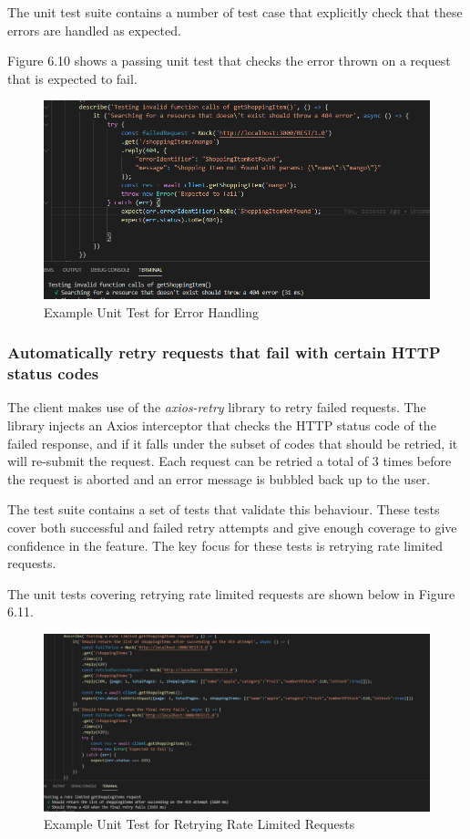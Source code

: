 The unit test suite contains a number of test case that explicitly check that these errors are handled as expected.

Figure 6.10 shows a passing unit test that checks the error thrown on a request that is expected to fail.
\begin{figure}[!htb]
    \caption{Example Unit Test for Error Handling}
\centering
\includegraphics[scale=0.57]{FYP_Dissertation_template/Figures/handcrafted-client-error-handling.PNG}
\end{figure}
\FloatBarrier
\subsubsection{Automatically retry requests that fail with certain HTTP status codes}
The client makes use of the \textit{axios-retry} library to retry failed requests. The library injects an Axios interceptor that checks the HTTP status code of the failed response, and if it falls under the subset of codes that should be retried, it will re-submit the request. Each request can be retried a total of 3 times before the request is aborted and an error message is bubbled back up to the user.

The test suite contains a set of tests that validate this behaviour. These tests cover both successful and failed retry attempts and give enough coverage to give confidence in the feature. The key focus for these tests is retrying rate limited requests.

The unit tests covering retrying rate limited requests are shown below in Figure 6.11.
\begin{figure}[!htb]
    \caption{Example Unit Test for Retrying Rate Limited Requests}
\centering
\includegraphics[scale=0.45]{FYP_Dissertation_template/Figures/rate-limited-handcrafted.PNG}
\end{figure}
\FloatBarrier
